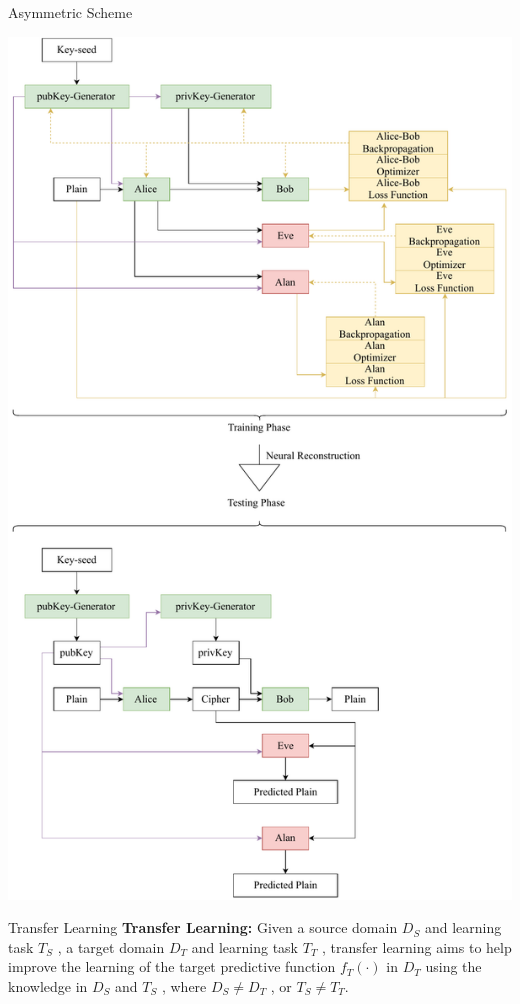 \documentclass{beamer}
\begin{document}
		\begin{frame}{Asymmetric Scheme}
			\begin{center}
				\includegraphics[height=0.9\textheight]{asymmetricScheme}
			\end{center}
		\end{frame}
		\begin{frame}{Transfer Learning}
			\textbf{Transfer Learning:} Given a source domain $ D_{S} $
			and learning task $ T_{S} $ , a target domain $ D_{T} $ and learning task
			$ T_{T} $ , transfer learning aims to help improve the learning of the
			target predictive function $ f_{T}(\cdot) $ in $ D_{T} $ using the knowledge in
			$ D_{S} $ and $ T_{S} $ , where $ D_{S} \neq D_{T} $ , or $ T_{S} \neq T_{T} $.~\citep{5288526}
		\end{frame}
\end{document}
